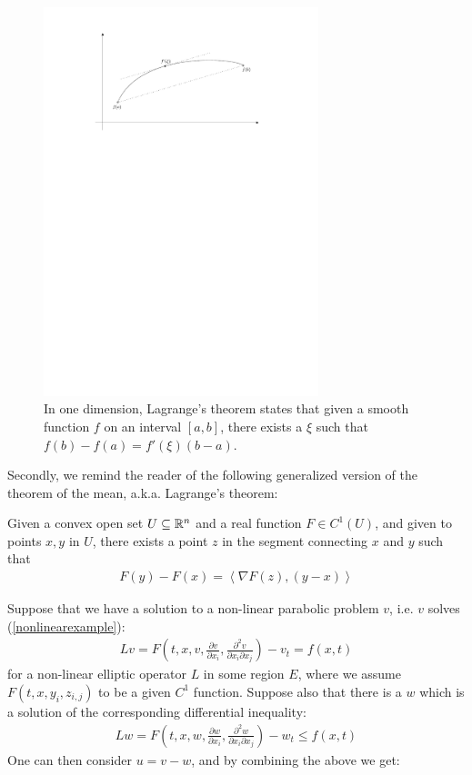 \begin{figure}
\centering
\includegraphics[width=0.713\textwidth]{figures/4_Lagrange_theorem}
\caption{In one dimension, Lagrange's theorem states that given a smooth function $f$ on an interval $[a, b]$, there exists a $\xi$ such that $f(b)-f(a) = f'(\xi) (b-a)$.}
\end{figure}
Secondly, we remind the reader of the following generalized version of the theorem of the mean, a.k.a. Lagrange's theorem:
\begin{theorem}
	Given a convex open set $U\subseteq \mathbb{R}^n$ and a real function $F \in C^1(U)$, and given to points $x, y$ in $U$, there exists a point $z$ in the segment connecting $x$ and $y$ such that 
	\begin{align*}
		F(y)-F(x) =\left\langle \nabla F(z), (y-x) \right\rangle 
	\end{align*}
\end{theorem}
Suppose that we have a solution to a non-linear parabolic problem $v$, i.e. $v$ solves (\ref{nonlinearexample}):
\begin{align*}
	Lv= F\left(t, x, v, \frac{\partial v}{\partial x_i} , \frac{\partial^2 v}{\partial x_i \partial x_j}\right)-v_t = f(x, t)
\end{align*}
for a non-linear elliptic operator $L$ in some region $E$, where we assume $F(t, x, y_i, z_{i,j})$ to be a given $C^1$ function. Suppose also that there is a $w$ which is a solution of the corresponding differential inequality:
\begin{align*}
	Lw= F\left(t, x, w, \frac{\partial w}{\partial x_i} , \frac{\partial^2 w}{\partial x_i \partial x_j}\right)-w_t \leq f(x, t)
\end{align*}
One can then consider $u = v-w$, and by combining the above we get: 

